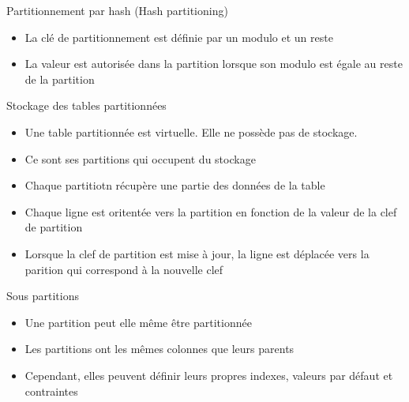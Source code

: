 
\begin{frame}[fragile]{Partitionnement par hash (Hash partitioning)}

   \begin{itemize}
      \item La clé de partitionnement est définie par un modulo et un reste
      \item La valeur est autorisée dans la partition lorsque son modulo est égale au reste de la partition
   \end{itemize}

\end{frame}


\begin{frame}[fragile]{Stockage des tables partitionnées}

   \begin{itemize}
      \item Une table partitionnée est virtuelle. Elle ne possède pas de stockage.
      \item Ce sont ses partitions qui occupent du stockage
      \item Chaque partitiotn récupère une partie des données de la table
      \item Chaque ligne est oritentée vers la partition en fonction de la valeur de la clef de partition
      \item Lorsque la clef de partition est mise à jour, la ligne est déplacée vers la parition qui correspond à la nouvelle clef
   \end{itemize}

\end{frame}


\begin{frame}[fragile]{Sous partitions}

   \begin{itemize}
      \item Une partition peut elle même être partitionnée
      \item Les partitions ont les mêmes colonnes que leurs parents
      \item Cependant, elles peuvent définir leurs propres indexes, valeurs par défaut et contraintes
   \end{itemize}

\begin{toile}
\end{toile}

\end{frame}

